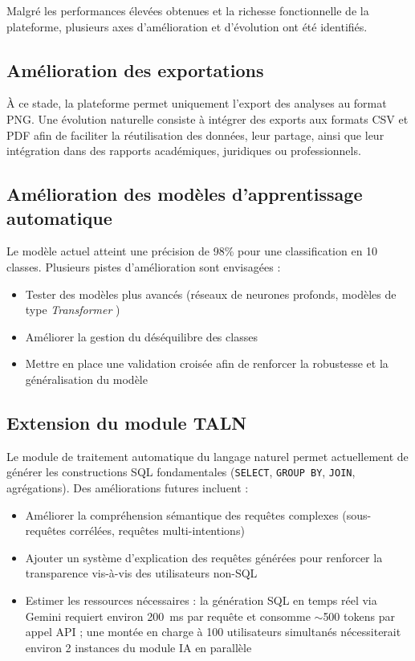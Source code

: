 \documentclass[10pt,twocolumn,a4paper]{article}
\begin{document}
Malgré les performances élevées obtenues et la richesse fonctionnelle de la plateforme, plusieurs axes d'amélioration et d'évolution ont été identifiés.

\subsection{Amélioration des exportations}

À ce stade, la plateforme permet uniquement l'export des analyses au format PNG. Une évolution naturelle consiste à intégrer des exports aux formats CSV et PDF afin de faciliter la réutilisation des données, leur partage, ainsi que leur intégration dans des rapports académiques, juridiques ou professionnels.

\subsection{Amélioration des modèles d'apprentissage automatique}

Le modèle actuel atteint une précision de 98\% pour une classification en 10 classes. Plusieurs pistes d'amélioration sont envisagées :
\begin{itemize}
    \item Tester des modèles plus avancés (réseaux de neurones profonds, modèles de type \textit{Transformer} \cite{sklearn})
    \item Améliorer la gestion du déséquilibre des classes
    \item Mettre en place une validation croisée afin de renforcer la robustesse et la généralisation du modèle
\end{itemize}

\subsection{Extension du module TALN}

Le module de traitement automatique du langage naturel permet actuellement de générer les constructions SQL fondamentales (\texttt{SELECT}, \texttt{GROUP BY}, \texttt{JOIN}, agrégations). Des améliorations futures incluent :
\begin{itemize}
    \item Améliorer la compréhension sémantique des requêtes complexes (sous-requêtes corrélées, requêtes multi-intentions)
    \item Ajouter un système d'explication des requêtes générées pour renforcer la transparence vis-à-vis des utilisateurs non-SQL
    \item Estimer les ressources nécessaires : la génération SQL en temps réel via Gemini requiert environ 200~ms par requête et consomme $\sim$500 tokens par appel API ; une montée en charge à 100 utilisateurs simultanés nécessiterait environ 2 instances du module IA en parallèle
\end{itemize}
\end{document}
